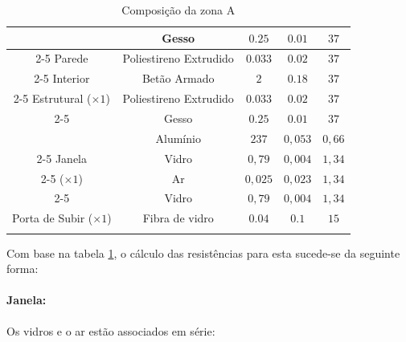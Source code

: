\documentclass[12pt, a4paper]{article}
\begin{document}
\begin{table}[htpb]
\begin{center}
\begin{tabular}{c c c c c}
			\multirow{5}{*}{}          & Gesso                  & $0.25$                            & $0.01$                       & $37$          \\
				\cline{2-5}
			Parede                     & Poliestireno Extrudido & $0.033$                           & $0.02$                       & $37$          \\
				\cline{2-5}
			Interior                   & Betão Armado           & $2$                               & $0.18$                       & $37$          \\
				\cline{2-5}
			Estrutural ($\times 1$)    & Poliestireno Extrudido & $0.033$                           & $0.02$                       & $37$          \\
				\cline{2-5}
			                           & Gesso                  & $0.25$                            & $0.01$                       & $37$          \\
				\midrule{}

			\multirow{5}{*}{}		   & Alumínio 				& $237$                            	& $0,053$                      & $0,66$		   \\
				\cline{2-5}
			Janela    				   & Vidro    				& $0,79$                           	& $0,004$                      & $1,34$		   \\
				\cline{2-5}
			($\times 1$)			   & Ar       				& $0,025$                          	& $0,023$                      & $1,34$		   \\
				\cline{2-5}
									   & Vidro    				& $0,79$                           	& $0,004$                      & $1,34$		   \\
				\midrule{}
			Porta de Subir ($\times 1$) & Fibra de vidro        & $0.04$                            & $0.1$                        & $15$           \\
			\bottomrule{}
		\end{tabular}
	\end{center}
	\caption{Composição da zona A}\label{tab:zona_a}
\end{table}

Com base na tabela \ref*{tab:zona_a}, o cálculo das resistências para esta sucede-se da seguinte forma:

\paragraph{Janela:}\label{par:zona_a_janela}Os vidros e o ar estão associados em série:
\end{document}
